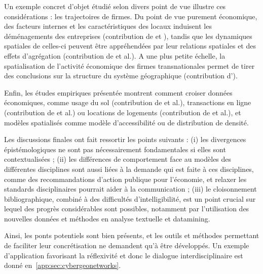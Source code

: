 Un exemple concret d'objet étudié selon divers point de vue illustre ces considérations : les trajectoires de firmes. Du point de vue purement économique, des facteurs internes et les caractéristiques des locaux induisent les déménagements des entreprises (contribution de  et ), tandis que les dynamiques spatiales de celles-ci peuvent être appréhendées par leur relations spatiales et des effets d'agrégation (contribution de  et al.). A une plus petite échelle, la spatialisation de l'activité économique des firmes transnationales permet de tirer des conclusions sur la structure du système géographique (contribution d').

Enfin, les études empiriques présentée montrent comment croiser données économiques, comme usage du sol (contribution de  et al.), transactions en ligne (contribution de  et al.) ou locations de logements (contribution de  et al.), et modèles spatialisés comme modèle d'accessibilité ou de distribution de densité.

Les discussions finales ont fait ressortir les points suivants : (i) les divergences épistémologiques ne sont pas nécessairement fondamentales si elles sont contextualisées ; (ii) les différences de comportement face au modèles des différentes disciplines sont aussi liées à la demande qui est faite à ces disciplines, comme des recommandations d'action publique pour l'économie, et relaxer les standards disciplinaires pourrait aider à la communication ; (iii) le cloisonnement bibliographique, combiné à des difficultés d'intelligibilité, est un point crucial sur lequel des progrès considérables sont possibles, notamment par l'utilisation des nouvelles données et méthodes en analyse textuelle et datamining.

Ainsi, les ponts potentiels sont bien présents, et les outils et méthodes permettant de faciliter leur concrétisation ne demandent qu'à être développés. Un exemple d'application favorisant la réflexivité et donc le dialogue interdisciplinaire est donné en~\ref{app:sec:cybergeonetworks}.











